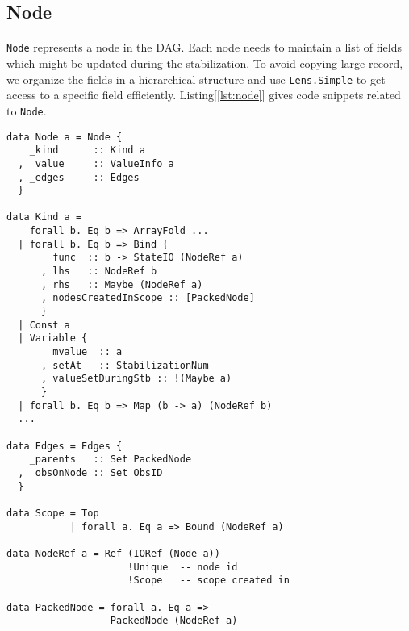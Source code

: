 \documentclass[a4paper, twocolumn]{article}
\newcommand{\code}{\texttt} %
\begin{document}
\subsection{Node}
\paragraph{} \code{Node} represents a node in the DAG. Each node needs to maintain a list of fields which might be updated during the stabilization. To avoid copying large record, we organize the fields in a hierarchical structure and use \code{Lens.Simple} to get access to a specific field efficiently. Listing[\ref{lst:node}] gives code snippets related to \code{Node}.

\begin{lstlisting}[caption=Node, label={lst:node}]
data Node a = Node {
    _kind      :: Kind a
  , _value     :: ValueInfo a
  , _edges     :: Edges
  }  

data Kind a =
    forall b. Eq b => ArrayFold ...
  | forall b. Eq b => Bind {
        func  :: b -> StateIO (NodeRef a)
      , lhs   :: NodeRef b
      , rhs   :: Maybe (NodeRef a)
      , nodesCreatedInScope :: [PackedNode]
      }
  | Const a
  | Variable {
        mvalue  :: a
      , setAt   :: StabilizationNum
      , valueSetDuringStb :: !(Maybe a)
      }
  | forall b. Eq b => Map (b -> a) (NodeRef b)
  ...
  
data Edges = Edges {
    _parents   :: Set PackedNode
  , _obsOnNode :: Set ObsID
  }

data Scope = Top
           | forall a. Eq a => Bound (NodeRef a)

data NodeRef a = Ref (IORef (Node a))
                     !Unique  -- node id
                     !Scope   -- scope created in

data PackedNode = forall a. Eq a => 
                  PackedNode (NodeRef a)
\end{lstlisting}
\end{document}
